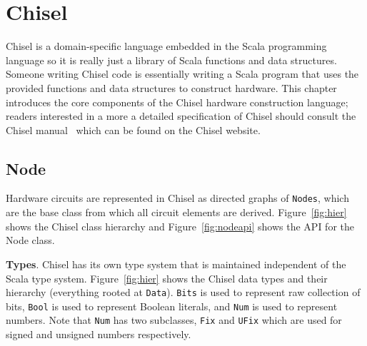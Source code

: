 \section{Chisel}
\label{sec:chisel}
Chisel is a domain-specific language embedded in the Scala
programming language so it is really just a library of Scala functions
and data structures. Someone writing Chisel code is essentially writing a Scala
program that uses the provided functions and data structures to
construct hardware. This chapter introduces the core
components of the Chisel hardware construction language; readers
interested in a more a detailed specification of Chisel should consult
the Chisel manual~\cite{chisel:man} which can be found on the Chisel website. 

\subsection{Node}
Hardware circuits are represented in Chisel as directed graphs of
{\tt Nodes}, which are the base class from which all circuit elements are
derived. Figure~\ref{fig:hier} shows the Chisel class
hierarchy and Figure~\ref{fig:nodeapi} shows the API for the Node class.

{\bf Types}. Chisel has its own type system that is maintained
independent of the Scala type system. Figure~\ref{fig:hier} shows the
Chisel data types and their hierarchy (everything rooted at
{\tt Data}). {\tt Bits} is used to represent raw collection of bits,
{\tt Bool} is used to represent Boolean literals, and {\tt Num} is
used to represent numbers. Note that {\tt Num} has two subclasses,
{\tt Fix} and {\tt UFix} which are used for signed and unsigned
numbers respectively.

